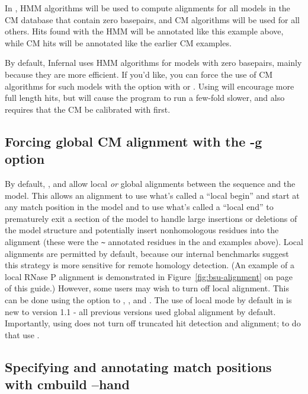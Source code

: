 In , HMM algorithms will be used to compute alignments
for all models in the CM database that contain zero basepairs, and CM
algorithms will be used for all others. Hits found with the HMM will
be annotated like this example above, while CM hits will be annotated
like the earlier CM examples.

By default, Infernal uses HMM algorithms for models with zero
basepairs, mainly because they are more efficient. If you'd like, you
can force the use of CM algorithms for such models with the
 option with  or . Using
 will encourage more full length hits, but will
cause the program to run a few-fold slower, and also requires that the
CM be calibrated with  first.

\subsection{Forcing global CM alignment with the -g option}

By default, ,  and  allow
local \emph{or} global alignments between the sequence and the
model. This allows an alignment to use what's called a ``local begin''
and start at any match position in the model and to use what's called
a ``local end'' to prematurely exit a section of the model to handle
large insertions or deletions of the model structure and potentially
insert nonhomologous residues into the alignment (these were the
\verb+~+ annotated residues in the  and 
examples above). Local alignments are permitted by default, because
our internal benchmarks suggest this strategy is more sensitive for
remote homology detection. (An example of a local RNase P alignment is
demonstrated in Figure~\ref{fig:bsu-alignment} on
page~\pageref{fig:bsu-alignment} of this guide.)
However, some users may wish to turn off local alignment. This can be
done using the  option to , ,
and . The use of local mode by default in 
is new to version 1.1 - all previous versions used global alignment by
default. Importantly, using  does not turn off truncated hit
detection and alignment; to do that use .

\subsection{Specifying and annotating match positions with cmbuild --hand}

